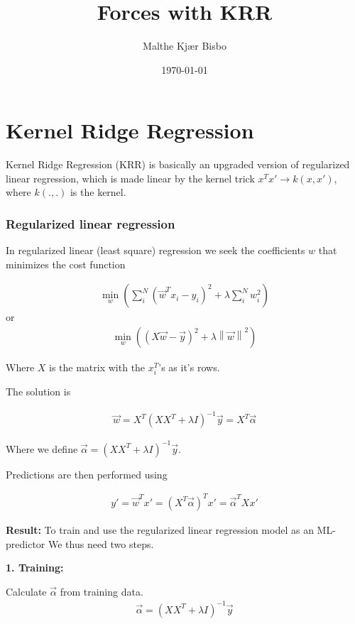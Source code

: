 \documentclass[english,a4paper,oneside, twocolumn,article,9pt]{memoir}
\title{Forces with KRR}
\author{Malthe Kjær Bisbo}
\date{\today}
\newcommand{\norm}[1]{\left\lVert#1\right\rVert}
\begin{document}
\thispagestyle{empty}
\maketitle

\chapter{Kernel Ridge Regression}
Kernel Ridge Regression (KRR) is basically an upgraded version of regularized linear regression, which is made linear by the kernel trick $x^Tx' \rightarrow k(x,x')$, where $k(.,.)$ is the kernel.

\subsection*{Regularized linear regression}
In regularized linear (least square) regression we seek the coefficients $w$ that minimizes the cost function

\begin{align*}
\min\limits_{w}\left(\sum_{i}^{N}(\vec{w}^Tx_i - y_i)^2 + \lambda\sum_{i}^{N}w_i^2\right)
\end{align*}
or
\begin{align*}
\min\limits_{w}\left((X\vec{w} - \vec{y})^2 + \lambda \norm{\vec{w}}^2\right)
\end{align*}

Where $X$ is the matrix with the $x_i^T$'s as it's rows.

The solution is

\begin{align*}
\vec{w} = X^T(XX^T + \lambda I)^{-1}\vec{y} = X^T\vec{\alpha}
\end{align*}

Where we define $\vec{\alpha} = (XX^T + \lambda I)^{-1}\vec{y}$.

Predictions are then performed using

\begin{align*}
y' = \vec{w}^T x' = (X^T\vec{\alpha})^T x' = \vec{\alpha}^T Xx'
\end{align*}

\bigskip
\textbf{Result:} To train and use the regularized linear regression model as an ML-predictor We thus need two steps.

\bigskip

\textbf{1. Training:}

Calculate $\vec{\alpha}$ from training data.
\begin{align*}
\vec{\alpha} = (XX^T + \lambda I)^{-1}\vec{y}
\end{align*} 
\end{document}
